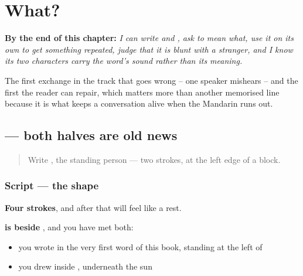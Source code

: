 
\chapter{What?}
\label{ch:zh-shenme}

\begin{chapteropening}
\textbf{By the end of this chapter:} \emph{I can write  and , ask  to mean what, use it on its own to get something repeated, judge that it is blunt with a stranger, and I know its two characters carry the word's sound rather than its meaning.}

The first exchange in the track that goes wrong -- one speaker mishears -- and the first the reader can repair, which matters more than another memorised line because it is what keeps a conversation alive when the Mandarin runs out.
\end{chapteropening}

\section[\texorpdfstring{\zh{什} (shén)}{什 (shén)}]{ — both halves are old news}

\label{lesson:ZH-W09-shen}



\begin{quote}
Write , the standing person — two strokes, at the left edge of a block.
\end{quote}

\subsection*{Script — the shape}

\begin{quote}
\end{quote}

\textbf{Four strokes}, and after  that will feel like a rest.

\textbf{ is  beside }, and you have met both:

\begin{itemize}
\raggedright
  \item \textbf{} you wrote in the very first word of this book, standing at the left of 
  \item \textbf{} you drew inside , underneath the sun
\end{itemize}

